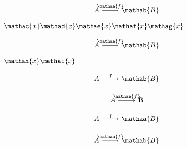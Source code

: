 \documentclass{article}
\begin{document}
\begin{equation*}
  \begin{tikzcd}
    A \arrow[r, "\mathaa{f}"] & \mathab{B}
  \end{tikzcd}
\end{equation*}
$\mathac{x}\mathad{x}\mathae{x}\mathaf{x}\mathag{x}$

\begin{equation*}
  \begin{tikzcd}
    A \arrow[r, "\mathaa{f}"] & \mathab{B}
  \end{tikzcd}
\end{equation*}
$\mathah{x}\mathai{x}$

\begin{equation*}
  \begin{tikzcd}
    A \arrow[r, "\mathbf{f}"] & \mathab{B}
  \end{tikzcd}
\end{equation*}

\begin{equation*}
  \begin{tikzcd}
    A \arrow[r, "\mathaa{f}"] & \mathbf{B}
  \end{tikzcd}
\end{equation*}

\begin{equation*}
  \begin{tikzcd}
    A \arrow[r, "\mathsf{f}"] & \mathaa{B}
  \end{tikzcd}
\end{equation*}

\begin{equation*}
  \begin{tikzcd}
    A \arrow[r, "\mathaa{f}"] & \mathab{B}
  \end{tikzcd}
\end{equation*}
\end{document}
